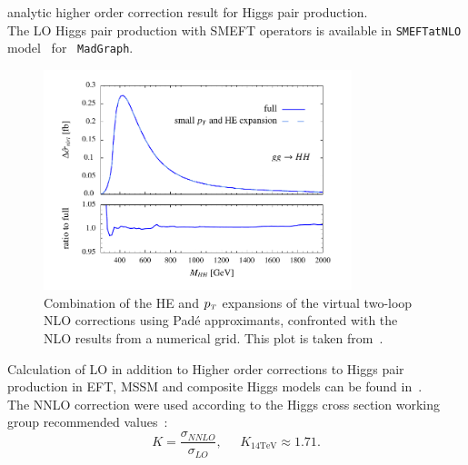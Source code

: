 analytic higher order correction result for Higgs pair production.\\
%
The LO Higgs pair production with SMEFT operators is available in \texttt{SMEFTatNLO} model~\cite{Degrande:2020evl} for ~\texttt{MadGraph}.

\begin{figure}[!htpb]
	\centering
	\includegraphics[width = 0.8\textwidth]{./figures/HH_NLO}
	\caption{Combination of the HE and $p_{\scriptscriptstyle T}$ expansions of the virtual two-loop NLO corrections using  Pad\'e  approximants,  confronted with the NLO results from a numerical grid. This plot is taken from~\cite{Bellafronte:2022jmo}. } 
	\label{dihiggs-gridplot}
\end{figure}
%
Calculation of LO in addition to Higher order corrections to Higgs pair production in EFT, MSSM and composite Higgs models can be found in~\cite{Grober:2010yv,Grober:2014zva,Grober:2015cwa,Grober:2017gut,deFlorian:2017qfk,Buchalla:2018yce}.\\ 
The NNLO correction were used according to the Higgs cross section working group recommended values~\cite{Dittmaier:2012vm,deFlorian:2016spz}:
\begin{equation}
	K = \frac{\sigma_{NNLO}}{\sigma_{LO}}, \;\;\;\;\; K_{14 \mathrm{TeV}} \approx 1.71.
\end{equation}
